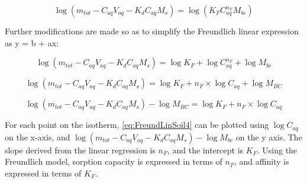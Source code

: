 \begin{equation} \label{eq:FreundLinSoil1}
   \log (m_{tot} - C_{aq}V_{aq} - K_dC_{aq}M_s) = \log (K_{F}C_{aq}^{n_F}M_{bc})
\end{equation}

Further modifications are made so as to simplify the Freundlich linear expression as y = b + ax:

\begin{equation} \label{eq:FreundLinSoil2}
    \log (m_{tot} - C_{aq}V_{aq} - K_dC_{aq}M_s) = \log K_{F} + \log C_{aq}^{n_F} + \log M_{bc}
\end{equation}

\begin{equation} \label{eq:FreundLinSoil3}
    \log (m_{tot} - C_{aq}V_{aq} - K_dC_{aq}M_s) = \log K_{F} + n_F \times \log C_{aq} + \log M_{BC}
\end{equation}

\begin{equation} \label{eq:FreundLinSoil4}
    \log (m_{tot} - C_{aq}V_{aq} - K_dC_{aq}M_s) - \log M_{BC} = \log K_{F} + n_F \times \log C_{aq}  
\end{equation}

For each point on the isotherm, \cref{eq:FreundLinSoil4} can be plotted using $\log C_{aq}$ on the x-axis, and $\log (m_{tot} - C_{aq}V_{aq} - K_dC_{aq}M_s) - \log M_{bc}$ on the y axis. The slope derived from the linear regression is $n_F$, and the intercept is $K_F$. Using the Freundlich model, sorption capacity is expressed in terms of \(n_F\), and affinity is expressed in terms of \(K_F\). 
